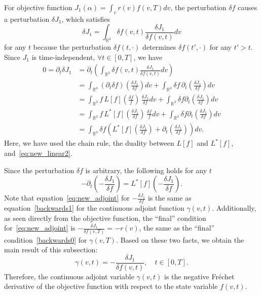 \documentclass[times,final,nopreprintline]{elsarticle}
\newcommand{\bbR}{\mathbb R} \newcommand{\bbS}{\mathbb S}
\newcommand{\Rthree}{{\bbR^3}}
\begin{document}
For objective function $J_1(\alpha) = \int_v r(v) f(v,T)dv$, the perturbation $\delta f$ causes a perturbation  $\delta J_1$, which satisfies 
$$\delta J_1 =  \int_\Rthree \delta f(v,t) \frac{\delta J_1}{\delta f(v,t)} dv$$
for any $t$ because the perturbation $\delta f(t, \cdot)$  determines $\delta f (t', \cdot)$ for any $t'>t$.
Since $J_1$ is time-independent, $\forall t\in[0,T]$, we have
\begin{align*}
    0 =\partial_t \delta J_1 &= \partial_t \left( \int_\Rthree \delta f(v,t) \frac{\delta J_1}{\delta f(v,t)} dv \right) \\
    &=  \int_\Rthree (\partial_t \delta f)  \left(\frac{\delta J_1}{\delta f}\right)dv + \int_\Rthree \delta f\, \partial_t \left(\frac{\delta J_1}{\delta f}\right)dv\\
    &=\int_\Rthree f\, L[f]\left(\frac{\delta f}{f}\right) \,\frac{\delta J_1}{\delta f}dv + \int_\Rthree \delta f \partial_t \left(\frac{\delta J_1}{\delta f}\right)dv\\
     &=\int_\Rthree f\, L^*[f] \left(\frac{\delta J_1}{\delta f} \right) \,\frac{\delta f}{f} dv + \int_\Rthree \delta f \partial_t \left(\frac{\delta J_1}{\delta f}\right)dv\\
     &=\int_\Rthree \delta f\left( L^*[f] \left(\frac{\delta J_1}{\delta f} \right) +  \partial_t \left(\frac{\delta J_1}{\delta f}\right)\right)dv.
\end{align*}
Here, we have used the chain rule, the duality between $L[f]$ and $L^*[f]$, and~\eqref{eq:new_linear2}. 


Since the perturbation $\delta f$ is arbitrary, the following holds for any $t$
\begin{equation}\label{eq:new_adjoint}
    - \partial_t \left(- \frac{\delta J_1}{\delta f}\right) = L^*[f] \left(-\frac{\delta J_1}{\delta f} \right).
\end{equation}
Note that equation~\eqref{eq:new_adjoint}  for $-\frac{\delta J_1}{\delta f}$  is the same as equation~\eqref{backwards1} for  the continuous adjoint  function $\gamma(v,t)$. Additionally, as seen directly from the objective function, the ``final'' condition for~\eqref{eq:new_adjoint} is $- \frac{\delta J_1}{\delta f(v,T)} = - r(v)$, the same as the ``final'' condition~\eqref{backwards0} for $\gamma(v,T)$. 
Based on these two facts, we obtain the main result of this subsection:
\begin{equation}\label{eq:true_continuous_gamma}
    \gamma(v,t) = - \frac{\delta J_1}{\delta f(v,t)},\quad t\in[0,T].
\end{equation}
Therefore, the continuous adjoint variable $\gamma(v,t)$ is the negative Fr\'echet derivative of the objective function with respect to the state variable $f(v,t)$. 
 
\end{document}
